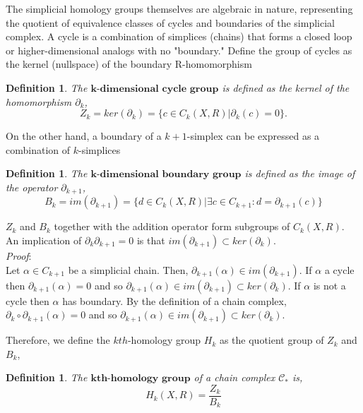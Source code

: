 \documentclass{article}
\newcommand{\be}{\begin{equation}}
\newcommand{\ee}{\end{equation}}
\newtheorem{definition}[theorem]{Definition}
\begin{document}
The simplicial homology groups themselves are algebraic in nature, representing the quotient of equivalence classes of cycles and boundaries of the simplicial complex. A cycle is a combination of simplices (chains) that forms a closed loop or higher-dimensional analogs with no "boundary." Define the group of cycles as the kernel (nullspace) of the boundary R-homomorphism
\begin{definition}The $\textbf{k-dimensional cycle group}$ is defined as the kernel of the homomorphism $\partial_{k}$,
\be
Z_k = ker(\partial_k) = \{c \in C_k(X,R)|  \partial_k(c) = 0 \}.
\ee
\end{definition}
On the other hand, a boundary of a $k+1$-simplex can be expressed as a combination of $k$-simplices
\begin{definition}
The $\textbf{k-dimensional boundary group}$ is defined as the image of the operator $\partial_{k+1}$,
\be
B_k = im(\partial_{k+1}) = \{d \in C_k(X,R) | \exists c \in C_{k+1} : d = \partial_{k+1}(c)\}
\ee
\end{definition}
$Z_k$ and $B_k$ together with the addition operator form subgroups of $C_k(X,R)$.\\
An implication of $\partial_k\partial_{k+1} = 0$ is that $im(\partial_{k+1}) \subset ker(\partial_k)$. \\
\textit{Proof}:\\
Let $\alpha \in C_{k+1}$ be a simplicial chain. Then, $\partial_{k+1}(\alpha) \in im(\partial_{k+1})$. If $\alpha$ a cycle then $\partial_{k+1}(\alpha) = 0$ and so $\partial_{k+1}(\alpha) \in im(\partial_{k+1}) \subset ker(\partial_k)$. If $\alpha$ is not a cycle then $\alpha$ has boundary. By the definition of a chain complex, $\partial_{k} \circ \partial_{k+1}(\alpha) = 0$ and so $\partial_{k+1}(\alpha) \in im(\partial_{k+1}) \subset ker(\partial_{k})$.

Therefore, we define the $kth$-homology group $H_k$ as the quotient group of $Z_k$ and $B_k$,
\begin{definition}
The $\textbf{kth-homology group}$ of a chain complex $\mathcal{C_{*}}$ is,
\be
H_k(X,R) = \frac{Z_k}{B_k}
\ee
\end{definition}
\end{document}
